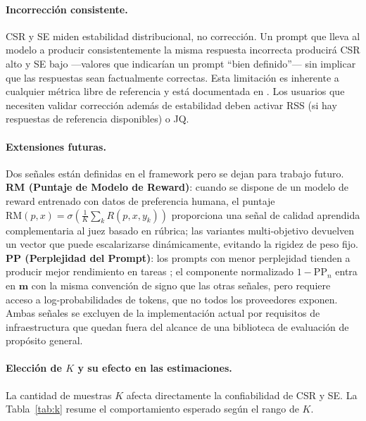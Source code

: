 \documentclass[11pt,a4paper]{article}
\begin{document}
\paragraph{Incorrección consistente.}
CSR y SE miden estabilidad distribucional, no corrección. Un prompt que lleva al modelo a producir consistentemente la misma respuesta incorrecta producirá CSR alto y SE bajo ---valores que indicarían un prompt ``bien definido''--- sin implicar que las respuestas sean factualmente correctas. Esta limitación es inherente a cualquier métrica libre de referencia y está documentada en \citet{glape2024}. Los usuarios que necesiten validar corrección además de estabilidad deben activar RSS (si hay respuestas de referencia disponibles) o JQ.

\paragraph{Extensiones futuras.}
Dos señales están definidas en el framework pero se dejan para trabajo futuro. \textbf{RM (Puntaje de Modelo de Reward)}: cuando se dispone de un modelo de reward entrenado con datos de preferencia humana, el puntaje $\mathrm{RM}(p, x) = \sigma\!\left(\frac{1}{K}\sum_k R(p, x, y_k)\right)$ proporciona una señal de calidad aprendida complementaria al juez basado en rúbrica; las variantes multi-objetivo \citep{armorm2024} devuelven un vector que puede escalarizarse dinámicamente, evitando la rigidez de peso fijo. \textbf{PP (Perplejidad del Prompt)}: los prompts con menor perplejidad tienden a producir mejor rendimiento en tareas \citep{promptperplexity2022}; el componente normalizado $1 - \mathrm{PP}_n$ entra en $\mathbf{m}$ con la misma convención de signo que las otras señales, pero requiere acceso a log-probabilidades de tokens, que no todos los proveedores exponen. Ambas señales se excluyen de la implementación actual por requisitos de infraestructura que quedan fuera del alcance de una biblioteca de evaluación de propósito general.

\paragraph{Elección de $K$ y su efecto en las estimaciones.}
La cantidad de muestras $K$ afecta directamente la confiabilidad de CSR y SE. La Tabla~\ref{tab:k} resume el comportamiento esperado según el rango de $K$.
\end{document}
